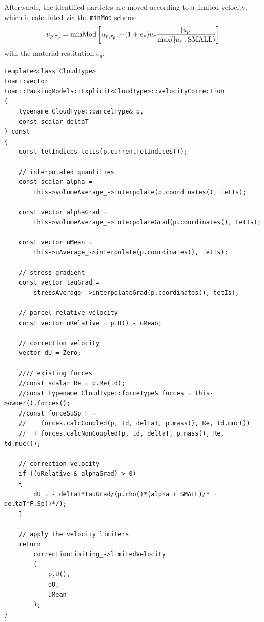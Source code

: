 Afterwards, the identified particles are moved according to a limited velocity, which is calculated via the \lstinline|minMod| scheme
\begin{equation}
\label{eq:correctLimiting}
    u_{p,\tau_p} = \operatorname{minMod} \left[ u_{p,\tau_p}, - (1+e_p) u_r \dfrac{\lvert u_p \rvert}{\max (\lvert u_r \rvert, \operatorname{SMALL})}  \right]
\end{equation}
with the material restitution $e_p$.
\ifcode
\begin{lstlisting}[firstline=142, caption=intermediate/submodels/MPPIC/PackingModels/Explicit/Explicit.C]
    template<class CloudType>
Foam::vector Foam::PackingModels::Explicit<CloudType>::velocityCorrection
(
    typename CloudType::parcelType& p,
    const scalar deltaT
) const
{
    const tetIndices tetIs(p.currentTetIndices());

    // interpolated quantities
    const scalar alpha =
        this->volumeAverage_->interpolate(p.coordinates(), tetIs);

    const vector alphaGrad =
        this->volumeAverage_->interpolateGrad(p.coordinates(), tetIs);

    const vector uMean =
        this->uAverage_->interpolate(p.coordinates(), tetIs);

    // stress gradient
    const vector tauGrad =
        stressAverage_->interpolateGrad(p.coordinates(), tetIs);

    // parcel relative velocity
    const vector uRelative = p.U() - uMean;

    // correction velocity
    vector dU = Zero;

    //// existing forces
    //const scalar Re = p.Re(td);
    //const typename CloudType::forceType& forces = this->owner().forces();
    //const forceSuSp F =
    //    forces.calcCoupled(p, td, deltaT, p.mass(), Re, td.muc())
    //  + forces.calcNonCoupled(p, td, deltaT, p.mass(), Re, td.muc());

    // correction velocity
    if ((uRelative & alphaGrad) > 0)
    {
        dU = - deltaT*tauGrad/(p.rho()*(alpha + SMALL)/* + deltaT*F.Sp()*/);
    }

    // apply the velocity limiters
    return
        correctionLimiting_->limitedVelocity
        (
            p.U(),
            dU,
            uMean
        );
}
\end{lstlisting}
\fi

